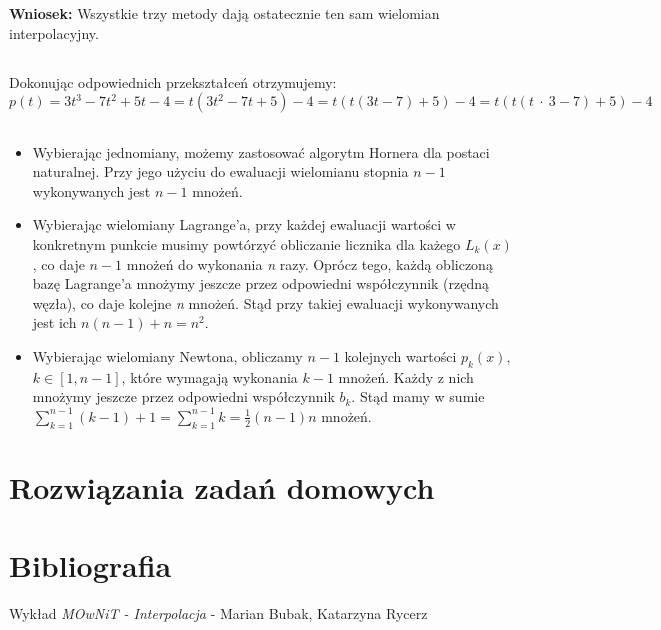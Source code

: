 \documentclass{article}
\begin{document}
\textbf{Wniosek:} Wszystkie trzy metody dają ostatecznie ten sam wielomian interpolacyjny.

\subsection{}
Dokonując odpowiednich przekształceń otrzymujemy:
\[p(t) = 3t^3 - 7t^2 + 5t - 4 = t(3t^2 - 7t + 5) - 4 = t(t(3t - 7) + 5) - 4 = t(t(t\ \cdot\ 3 - 7) + 5) - 4\]

\subsection{}
\begin{itemize}
    \item Wybierając jednomiany, możemy zastosować algorytm Hornera dla postaci naturalnej. Przy jego użyciu do ewaluacji wielomianu stopnia \(n-1\) wykonywanych jest \(n-1\) mnożeń.
    \item Wybierając wielomiany Lagrange’a, przy każdej ewaluacji wartości w konkretnym punkcie musimy powtórzyć obliczanie licznika dla każego \(L_k(x)\), co daje \(n-1\) mnożeń do wykonania \textit{n} razy. Oprócz tego, każdą obliczoną bazę Lagrange’a mnożymy jeszcze przez odpowiedni współczynnik (rzędną węzła), co daje kolejne \textit{n} mnożeń. Stąd przy takiej ewaluacji wykonywanych jest ich \(n(n-1) + n = n^2\).
    \item Wybierając wielomiany Newtona, obliczamy \(n-1\) kolejnych wartości \(p_k(x),\)
    \(k \in [1, n-1]\), które wymagają wykonania \(k-1\) mnożeń. Każdy z nich mnożymy jeszcze przez odpowiedni współczynnik \(b_k\). Stąd mamy w sumie \(\sum_{k=1}^{n-1} (k-1)+1 = \sum_{k=1}^{n-1} k = \frac{1}{2}(n-1)n\) mnożeń.
\end{itemize}

\section{Rozwiązania zadań domowych}

\subsection{}

\section{Bibliografia}
Wykład \textit{MOwNiT - Interpolacja} - Marian Bubak, Katarzyna Rycerz
\end{document}
